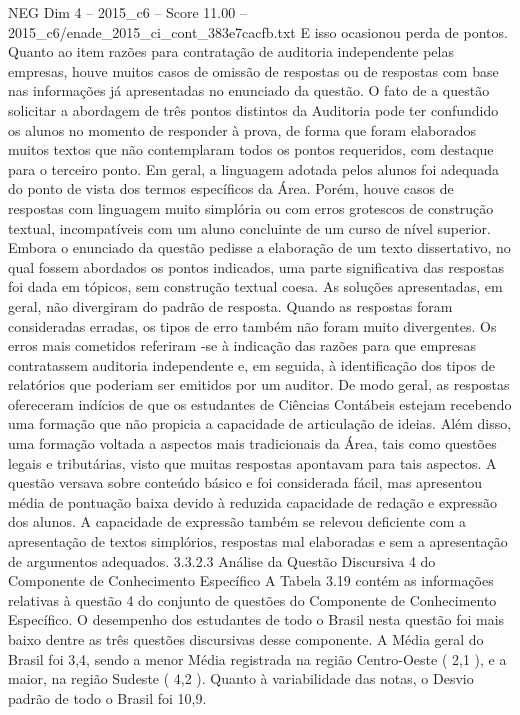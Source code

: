 \begin{textsample}{NEG Dim 4 – 2015\_c6 – Score 11.00 – 2015\_c6/enade\_2015\_ci\_cont\_383e7cacfb.txt}
E isso ocasionou perda de pontos.
Quanto ao item razões para contratação de auditoria independente pelas empresas, houve muitos casos de omissão de respostas ou de respostas com base nas informações já apresentadas no enunciado da questão.
O fato de a questão solicitar a abordagem de três pontos distintos da Auditoria pode ter confundido os alunos no momento de responder à prova, de forma que foram elaborados muitos textos que não contemplaram todos os pontos requeridos, com destaque para o terceiro ponto.
Em geral, a linguagem adotada pelos alunos foi adequada do ponto de vista dos termos específicos da Área.
Porém, houve casos de respostas com linguagem muito simplória ou com erros grotescos de construção textual, incompatíveis com um aluno concluinte de um curso de nível superior.
Embora o enunciado da questão pedisse a elaboração de um texto dissertativo, no qual fossem abordados os pontos indicados, uma parte significativa das respostas foi dada em tópicos, sem construção textual coesa.
As soluções apresentadas, em geral, não divergiram do padrão de resposta.
Quando as respostas foram consideradas erradas, os tipos de erro também não foram muito divergentes.
Os erros mais cometidos referiram -se à indicação das razões para que empresas contratassem auditoria independente e, em seguida, à identificação dos tipos de relatórios que poderiam ser emitidos por um auditor.
De modo geral, as respostas ofereceram indícios de que os estudantes de Ciências Contábeis estejam recebendo uma formação que não propicia a capacidade de articulação de ideias.
Além disso, uma formação voltada a aspectos mais tradicionais da Área, tais como questões legais e tributárias, visto que muitas respostas apontavam para tais aspectos.
A questão versava sobre conteúdo básico e foi considerada fácil, mas apresentou média de pontuação baixa devido à reduzida capacidade de redação e expressão dos alunos.
A capacidade de expressão também se relevou deficiente com a apresentação de textos simplórios, respostas mal elaboradas e sem a apresentação de argumentos adequados. 3.3.2.3 Análise da Questão Discursiva 4 do Componente de Conhecimento Específico A Tabela 3.19 contém as informações relativas à questão 4 do conjunto de questões do Componente de Conhecimento Específico.
O desempenho dos estudantes de todo o Brasil nesta questão foi mais baixo dentre as três questões discursivas desse componente.
A Média geral do Brasil foi 3,4, sendo a menor Média registrada na região Centro-Oeste ( 2,1 ), e a maior, na região Sudeste ( 4,2 ).
Quanto à variabilidade das notas, o Desvio padrão de todo o Brasil foi 10,9.

\end{textsample}
